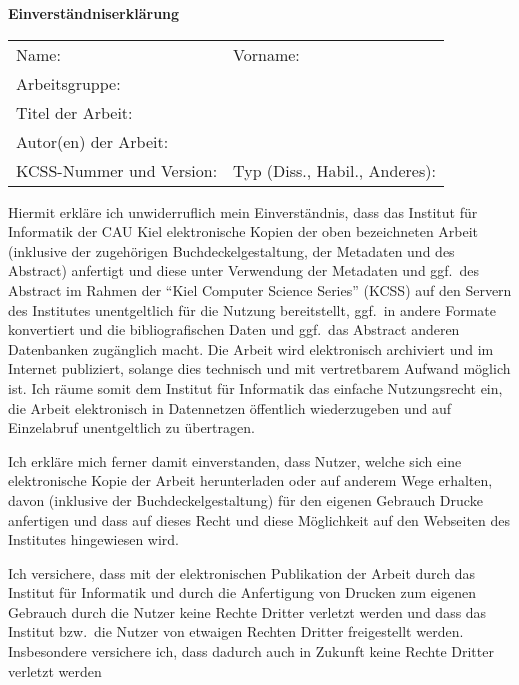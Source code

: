 \documentclass[11pt,oneside]{article}
\begin{document}
\thispagestyle{empty}
\enlargethispage{2\baselineskip}
\begin{center}
  \Large
  \textbf{Einverständniserklärung}
  \normalsize
\end{center}
\medskip
\begin{tabular}[t]{@{}p{}@{}p{}@{}}
  Name: & Vorname: \\[\baselineskip]
  Arbeitsgruppe: \\[\baselineskip]
  Titel der Arbeit: \\[2\baselineskip]
  Autor(en) der Arbeit: \\[\baselineskip]
  KCSS-Nummer und Version: & Typ (Diss.\@, Habil.\@, Anderes):
\end{tabular}
\par\bigskip
%
%
Hiermit erkläre ich unwiderruflich mein Einverständnis,
dass das Institut für Informatik der CAU Kiel
elektronische Kopien der oben bezeichneten Arbeit
(inklusive der zugehörigen Buchdeckelgestaltung, der Metadaten und des Abstract)
anfertigt und diese unter Verwendung der Metadaten und ggf.~des Abstract
im Rahmen der \enquote{Kiel Computer Science Series} (KCSS)
auf den Servern des Institutes
unentgeltlich für die Nutzung bereitstellt,
ggf.~in andere Formate konvertiert
und die bibliografischen Daten und ggf.~das Abstract anderen Datenbanken zugänglich macht.
Die Arbeit wird elektronisch archiviert und im Internet publiziert,
solange dies technisch und mit vertretbarem Aufwand möglich ist.
Ich räume somit dem Institut für Informatik
das einfache Nutzungsrecht ein,
die Arbeit elektronisch in Datennetzen öffentlich wiederzugeben
und auf Einzelabruf unentgeltlich zu übertragen.
\par
%
%
Ich erkläre mich ferner damit einverstanden,
dass Nutzer, welche sich eine elektronische Kopie der Arbeit herunterladen
oder auf anderem Wege erhalten,
davon (inklusive der Buchdeckelgestaltung) für den eigenen Gebrauch Drucke anfertigen
und dass auf dieses Recht und diese Möglichkeit
auf den Webseiten des Institutes hingewiesen wird.
\par
%
%
Ich versichere, dass mit der elektronischen Publikation der Arbeit
durch das Institut für Informatik
und durch die Anfertigung von Drucken zum eigenen Gebrauch durch die Nutzer
keine Rechte Dritter verletzt werden und dass das Institut
bzw.~die Nutzer von etwaigen Rechten Dritter freigestellt werden.
%
%
Insbesondere versichere ich,
dass dadurch auch in Zukunft keine Rechte Dritter verletzt werden
\end{document}

